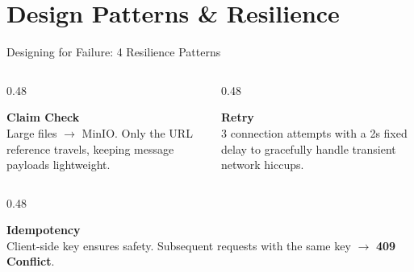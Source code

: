 \section{Design Patterns \& Resilience}

\begin{frame}{Designing for Failure: 4 Resilience Patterns}
    \vspace{0.2cm}
    
    \begin{columns}[T]
        \begin{column}{0.48\textwidth}
            \begin{tcolorbox}[enhanced, colback=white, colframe=blue!70!black, arc=4pt, boxrule=1pt, drop fuzzy shadow]
                \textbf{\textcolor{blue!70!black}{\large Claim Check}}\\[4pt]
                \scriptsize Large files $\rightarrow$ MinIO. Only the URL reference travels, keeping message payloads lightweight.
            \end{tcolorbox}
        \end{column}
        
        \begin{column}{0.48\textwidth}
            \begin{tcolorbox}[enhanced, colback=white, colframe=orange!80!black, arc=4pt, boxrule=1pt, drop fuzzy shadow]
                \textbf{\textcolor{orange!80!black}{\large Retry}}\\[4pt]
                \scriptsize 3 connection attempts with a 2s fixed delay to gracefully handle transient network hiccups.
            \end{tcolorbox}
        \end{column}
    \end{columns}

    \vspace{0.3cm} 

    \begin{columns}[T]
        \begin{column}{0.48\textwidth}
            \begin{tcolorbox}[enhanced, colback=white, colframe=green!60!black, arc=4pt, boxrule=1pt, drop fuzzy shadow]
                \textbf{\textcolor{green!60!black}{\large Idempotency}}\\[4pt]
                \scriptsize Client-side key ensures safety. Subsequent requests with the same key $\rightarrow$ \textbf{409 Conflict}.
            \end{tcolorbox}
        \end{column}
        

\end{columns}
\end{frame}
